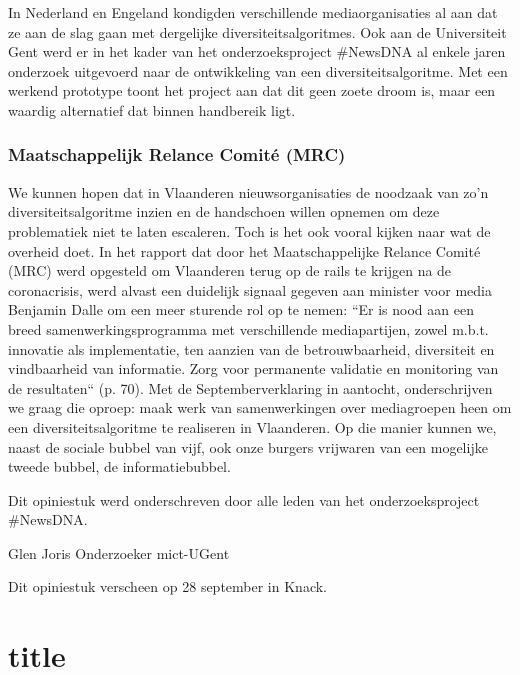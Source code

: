 \documentclass{report}
\begin{document}
In Nederland en Engeland kondigden verschillende mediaorganisaties al aan dat ze aan de slag gaan met dergelijke diversiteitsalgoritmes. Ook aan de Universiteit Gent werd er in het kader van het onderzoeksproject #NewsDNA al enkele jaren onderzoek uitgevoerd naar de ontwikkeling van een diversiteitsalgoritme. Met een werkend prototype toont het project aan dat dit geen zoete droom is, maar een waardig alternatief dat binnen handbereik ligt.

\subsection{Maatschappelijk Relance Comité (MRC)}

We kunnen hopen dat in Vlaanderen nieuwsorganisaties de noodzaak van zo’n diversiteitsalgoritme inzien en de handschoen willen opnemen om deze problematiek niet te laten escaleren. Toch is het ook vooral kijken naar wat de overheid doet. In het rapport dat door het Maatschappelijke Relance Comité (MRC) werd opgesteld om Vlaanderen terug op de rails te krijgen na de coronacrisis, werd alvast een duidelijk signaal gegeven aan minister voor media Benjamin Dalle om een meer sturende rol op te nemen: “Er is nood aan een breed samenwerkingsprogramma met verschillende mediapartijen, zowel m.b.t. innovatie als implementatie, ten aanzien van de betrouwbaarheid, diversiteit en vindbaarheid van informatie. Zorg voor permanente validatie en monitoring van de resultaten“ (p. 70). Met de Septemberverklaring in aantocht, onderschrijven we graag die oproep: maak werk van samenwerkingen over mediagroepen heen om een diversiteitsalgoritme te realiseren in Vlaanderen. Op die manier kunnen we, naast de sociale bubbel van vijf, ook onze burgers vrijwaren van een mogelijke tweede bubbel, de informatiebubbel.

Dit opiniestuk werd onderschreven door alle leden van het onderzoeksproject #NewsDNA.

Glen Joris Onderzoeker mict-UGent

Dit opiniestuk verscheen op 28 september in Knack.

\chapter{title}
	
\end{document}
